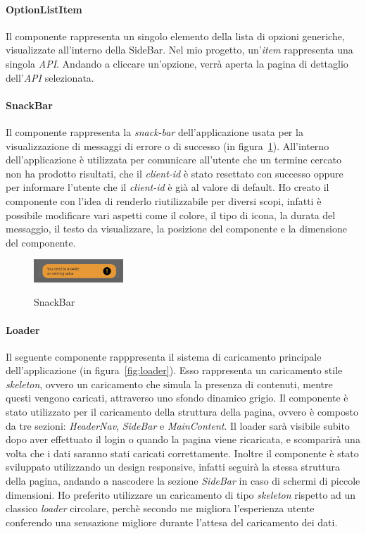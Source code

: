 \paragraph{OptionListItem}\label{par:option-list-item}
Il componente rappresenta un singolo elemento della lista di opzioni generiche, visualizzate all'interno della SideBar. Nel mio progetto, un'\textit{item} rappresenta una singola \textit{API}.
Andando a cliccare un'opzione, verrà aperta la pagina di dettaglio dell'\textit{API} selezionata.

\paragraph{SnackBar}\label{par:snack-bar}
Il componente rappresenta la \textit{snack-bar} dell'applicazione usata per la visualizzazione di messaggi di errore o di successo (in figura~\ref{fig:snack-bar}).
All'interno dell'applicazione è utilizzata per comunicare all'utente che un termine cercato non ha prodotto risultati,  che il \textit{client-id} è stato resettato con successo
oppure per informare l'utente che il \textit{client-id} è già al valore di default.
Ho creato il componente con l'idea di renderlo riutilizzabile per diversi scopi, infatti è possibile modificare vari aspetti come il colore, il tipo di icona,
la durata del messaggio, il testo da visualizzare, la posizione del componente e la dimensione del componente.

\begin{figure}[ht]
  \centering
  \includegraphics[width=0.3\textwidth, alt={Snackbar di errore}]{images/frontend/SnackBar1.jpg}
  \caption{SnackBar}\label{fig:snack-bar}
\end{figure}

\paragraph{Loader}\label{par:loader}
Il seguente componente rapppresenta il sistema di caricamento principale dell'applicazione (in figura~\ref{fig:loader}).
Esso rappresenta un caricamento stile \textit{skeleton}, ovvero un caricamento che simula la presenza di contenuti, mentre questi vengono caricati, attraverso 
uno sfondo dinamico grigio.
Il componente è stato utilizzato per il caricamento della struttura della pagina, ovvero è composto da tre sezioni: \textit{HeaderNav}, \textit{SideBar} e
\textit{MainContent}. Il loader sarà visibile subito dopo aver effettuato il login o quando la pagina viene ricaricata, e scomparirà una volta che i dati saranno stati caricati correttamente.
Inoltre il componente è stato sviluppato utilizzando un design responsive, infatti seguirà la stessa struttura della pagina, andando a nascodere la sezione 
\textit{SideBar} in caso di schermi di piccole dimensioni.
Ho preferito utilizzare un caricamento di tipo \textit{skeleton} rispetto ad un classico \textit{loader} circolare, perchè secondo me migliora l'esperienza utente 
conferendo una sensazione migliore durante l'attesa del caricamento dei dati.

